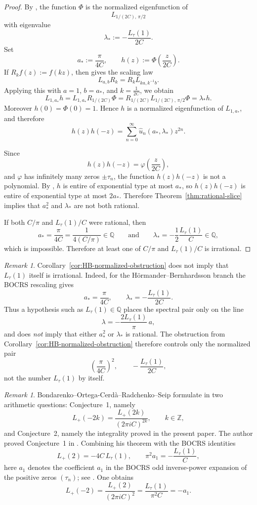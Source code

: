 \documentclass[11pt,letterpaper]{amsart}
\numberwithin{equation}{section}
\theoremstyle{plain}
\theoremstyle{remark}
\newtheorem{remark}[theorem]{Remark}
\newcommand{\Z}{\mathbb{Z}}
\newcommand{\Q}{\mathbb{Q}}
\begin{document}
\begin{proof}
By \cite[Theorem~1.1]{BOCRS}, the function \(\Phi\) is the normalized eigenfunction of
\[
L_{1/(2C),\,\pi/2}
\]
with eigenvalue
\[
\lambda_*:=-\frac{L_{\tau}(1)}{2C}.
\]
Set
\[
a_*:=\frac{\pi}{4C},
\qquad
h(z):=\Phi\!\left(\frac{z}{2C}\right).
\]
If \(R_kf(z):=f(kz)\), then \cite[\S4]{BOCRS} gives the scaling law
\[
L_{a,b}R_k=R_kL_{ka,k^{-1}b}.
\]
Applying this with \(a=1\), \(b=a_*\), and \(k=\frac{1}{2C}\), we obtain
\[
L_{1,a_*}h
=
L_{1,a_*}R_{1/(2C)}\Phi
=
R_{1/(2C)}L_{1/(2C),\,\pi/2}\Phi
=
\lambda_* h.
\]
Moreover \(h(0)=\Phi(0)=1\). Hence \(h\) is a normalized eigenfunction of \(L_{1,a_*}\), and
therefore
\[
h(z)h(-z)=\sum_{n=0}^{\infty}\widehat u_n(a_*,\lambda_*)z^{2n}.
\]

Since
\[
h(z)h(-z)=\varphi\!\left(\frac{z}{2C}\right),
\]
and \(\varphi\) has infinitely many zeros \(\pm\tau_n\), the function \(h(z)h(-z)\) is not a
polynomial. By \cite[Corollary~7.2]{BOCRS}, \(h\) is entire of exponential type at most
\(a_*\), so \(h(z)h(-z)\) is entire of exponential type at most \(2a_*\). Therefore
Theorem~\ref{thm:rational-slice} implies that \(a_*^2\) and \(\lambda_*\) are not both rational.

If both \(C/\pi\) and \(L_{\tau}(1)/C\) were rational, then
\[
a_*=\frac{\pi}{4C}=\frac{1}{4(C/\pi)}\in\Q
\qquad\text{and}\qquad
\lambda_*=-\frac{1}{2}\frac{L_{\tau}(1)}{C}\in\Q,
\]
which is impossible. Therefore at least one of \(C/\pi\) and \(L_{\tau}(1)/C\) is irrational.
\end{proof}

\begin{remark}\label{rem:not-Ltau}
Corollary~\ref{cor:HB-normalized-obstruction} does not imply that \(L_{\tau}(1)\) itself is
irrational.  Indeed, for the H\"ormander--Bernhardsson branch the BOCRS rescaling gives
\[
a_*=\frac{\pi}{4C},
\qquad
\lambda_*=-\frac{L_{\tau}(1)}{2C}.
\]
Thus a hypothesis such as \(L_{\tau}(1)\in\Q\) places the spectral pair only on the line
\[
\lambda=-\frac{2L_{\tau}(1)}{\pi}\,a,
\]
and does \emph{not} imply that either \(a_*^2\) or \(\lambda_*\) is rational.  The obstruction
from Corollary~\ref{cor:HB-normalized-obstruction} therefore controls only the normalized pair
\[
\left(\frac{\pi}{4C}\right)^2,
\qquad
-\frac{L_{\tau}(1)}{2C},
\]
not the number \(L_{\tau}(1)\) by itself.
\end{remark}

\begin{remark}\label{rem:Lplusminus2}
Bondarenko--Ortega-Cerd\`a--Radchenko--Seip formulate in \cite[\S10]{BOCRS} two arithmetic questions: Conjecture~1, namely
\[
L_{+}(-2k)=\frac{L_{+}(2k)}{(2\pi iC)^{2k}},
\qquad k\in\Z,
\]
and Conjecture~2, namely the integrality proved in the present paper. The author proved Conjecture~1 in \cite[Theorem~1.2]{NguyenDangHB}. Combining his theorem with the BOCRS identities
\[
L_{+}(2)=-4C\,L_{\tau}(1),
\qquad
\pi^2 a_1=-\frac{L_{\tau}(1)}{C},
\]
here \(a_1\) denotes the coefficient \(a_1\) in the BOCRS odd inverse-power expansion of
the positive zeros \((\tau_n)\); see \cite[(1.7)]{BOCRS}. One obtains
\[
L_{+}(-2)
=
\frac{L_{+}(2)}{(2\pi iC)^2}
=
\frac{L_{\tau}(1)}{\pi^2C}
=
-a_1.
\]
\end{remark}
\end{document}
